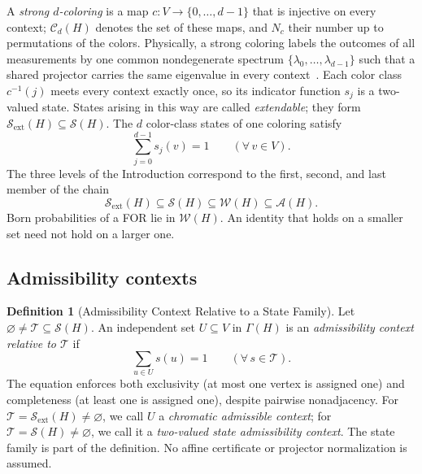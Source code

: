 \documentclass[aps,pra,reprint,superscriptaddress,longbibliography,nofootinbib,floatfix,10pt]{revtex4-2}
\theoremstyle{definition}\newtheorem{definition}[theorem]{Definition}
\theoremstyle{remark}\newtheorem{remark}[theorem]{Remark}
\newcommand{\Sc}{\mathcal S}\newcommand{\Cc}{\mathcal C}\newcommand{\Wc}{\mathcal W}
\begin{document}
A \emph{strong $d$-coloring} is a map $c:V\to\{0,\ldots,d-1\}$ that is injective on every context; $\Cc_d(H)$ denotes the set of these maps, and $N_c$ their number up to permutations of the colors. Physically, a strong coloring labels the outcomes of all measurements by one common nondegenerate spectrum $\{\lambda_0,\ldots,\lambda_{d-1}\}$ such that a shared projector carries the same eigenvalue in every context~\cite{svozil-2020-c,svozil-2021-chroma,svozil-2026-chromaticcoordinatization}. Each color class $c^{-1}(j)$ meets every context exactly once, so its indicator function $s_j$ is a two-valued state. States arising in this way are called \emph{extendable}; they form $\Sc_{\mathrm{ext}}(H)\subseteq\Sc(H)$. The $d$ color-class states of one coloring satisfy
\begin{equation}\label{eq:color-class-partition}
\sum_{j=0}^{d-1} s_j(v) = 1 \qquad (\forall\, v\in V).
\end{equation}
The three levels of the Introduction correspond to the first, second, and last member of the chain
\begin{equation}\label{eq:three-levels}
\Sc_{\mathrm{ext}}(H)\subseteq\Sc(H)\subseteq\Wc(H)\subseteq\mathcal A(H).
\end{equation}
Born probabilities of a FOR lie in $\Wc(H)$. An identity that holds on a smaller set need not hold on a larger one.

\subsection{Admissibility contexts}

\begin{definition}[Admissibility Context Relative to a State Family]\label{def:admissibility-context}
Let $\varnothing\neq\mathcal T\subseteq\Sc(H)$. An independent set $U\subseteq V$ in $\Gamma(H)$ is an \emph{admissibility context relative to $\mathcal T$} if
\begin{equation}\label{eq:admissibility-context}
\sum_{u\in U}s(u)=1\qquad(\forall\,s\in\mathcal T).
\end{equation}
The equation enforces both exclusivity (at most one vertex is assigned one) and completeness (at least one is assigned one), despite pairwise nonadjacency. For $\mathcal T=\Sc_{\mathrm{ext}}(H)\neq\varnothing$, we call $U$ a \emph{chromatic admissible context}; for $\mathcal T=\Sc(H)\neq\varnothing$, we call it a \emph{two-valued state admissibility context}. The state family is part of the definition. No affine certificate or projector normalization is assumed.
\end{definition}
\end{document}
